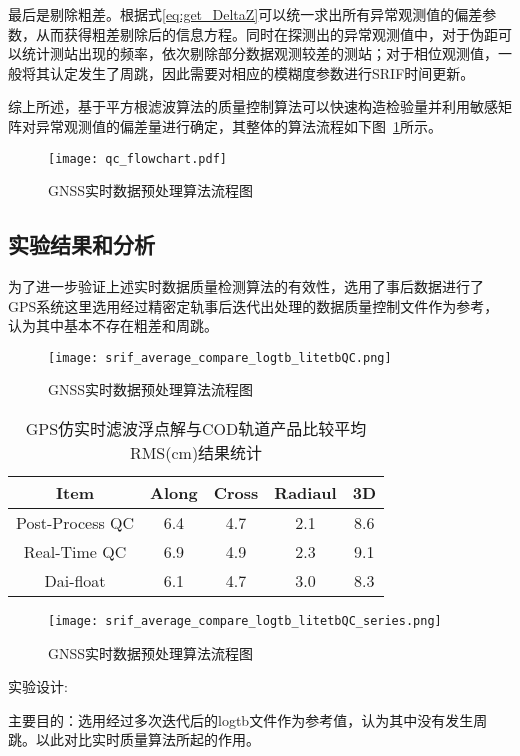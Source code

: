 最后是剔除粗差。根据式\eqref{eq:get_DeltaZ}可以统一求出所有异常观测值的偏差参数，从而获得粗差剔除后的信息方程。同时在探测出的异常观测值中，对于伪距可以统计测站出现的频率，依次剔除部分数据观测较差的测站；对于相位观测值，一般将其认定发生了周跳，因此需要对相应的模糊度参数进行SRIF时间更新。

综上所述，基于平方根滤波算法的质量控制算法可以快速构造检验量并利用敏感矩阵对异常观测值的偏差量进行确定，其整体的算法流程如下图~\ref{fig:qc_flowchart}所示。

\begin{figure}
  \centering
  \texttt{[image: qc\_flowchart.pdf]}
  \caption{GNSS实时数据预处理算法流程图}
  \label{fig:qc_flowchart}
\end{figure}

\subsection{实验结果和分析}
为了进一步验证上述实时数据质量检测算法的有效性，选用了事后数据进行了GPS系统这里选用经过精密定轨事后迭代出处理的数据质量控制文件作为参考，认为其中基本不存在粗差和周跳。

\begin{figure}
  \centering
  \texttt{[image: srif\_average\_compare\_logtb\_litetbQC.png]}
  \caption{GNSS实时数据预处理算法流程图}
  \label{fig:tbqc_compare}
\end{figure}

\begin{table}[ht]
  \centering
  \caption{GPS仿实时滤波浮点解与COD轨道产品比较平均RMS(cm)结果统计}
  \label{tab:tbqc_compare}
  \begin{tabular}{ccccc}
    \toprule
    Item & Along & Cross & Radiaul & 3D \\
    \midrule
	Post-Process QC & 6.4 & 4.7 & 2.1 & 8.6 \\
	Real-Time QC & 6.9 & 4.9 & 2.3 & 9.1 \\
	Dai-float & 6.1 & 4.7 & 3.0 & 8.3  \\
    \bottomrule
  \end{tabular}
\end{table}

\begin{figure}
  \centering
  \texttt{[image: srif\_average\_compare\_logtb\_litetbQC\_series.png]}
  \caption{GNSS实时数据预处理算法流程图}
  \label{fig:tbqc_compare_series}
\end{figure}


实验设计:

主要目的：选用经过多次迭代后的log\underline{\space}tb文件作为参考值，认为其中没有发生周跳。以此对比实时质量算法所起的作用。

